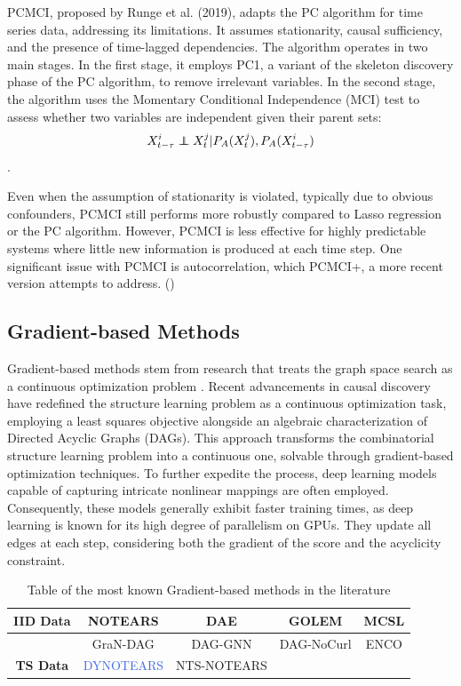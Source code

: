 PCMCI, proposed by Runge et al. (2019), adapts the PC algorithm for time series data, addressing its limitations. It assumes stationarity, causal sufficiency, and the presence of time-lagged dependencies. The algorithm operates in two main stages. In the first stage, it employs PC1, a variant of the skeleton discovery phase of the PC algorithm, to remove irrelevant variables. In the second stage, the algorithm uses the Momentary Conditional Independence (MCI) test to assess whether two variables are independent given their parent sets: $$X^i_{t - \tau} \independent X^j_t | P_A(X^j_t), P_A(X^i_{t - \tau})$$  \cite{hasan2023survey}.

Even when the assumption of stationarity is violated, typically due to obvious confounders, PCMCI still performs more robustly compared to Lasso regression or the PC algorithm. However, PCMCI is less effective for highly predictable systems where little new information is produced at each time step. One significant issue with PCMCI is autocorrelation, which PCMCI+, a more recent version attempts to address. (\cite{runge2020discovering})

\subsection{Gradient-based Methods}
Gradient-based methods stem from research that treats the graph space search as a continuous optimization problem \cite{molak2023causal}. Recent advancements in causal discovery have redefined the structure learning problem as a continuous optimization task, employing a least squares objective alongside an algebraic characterization of Directed Acyclic Graphs (DAGs). This approach transforms the combinatorial structure learning problem into a continuous one, solvable through gradient-based optimization techniques. To further expedite the process, deep learning models capable of capturing intricate nonlinear mappings are often employed. Consequently, these models generally exhibit faster training times, as deep learning is known for its high degree of parallelism on GPUs. They update all edges at each step, considering both the gradient of the score and the acyclicity constraint. \cite{hasan2023survey}\\

\begin{table}[!ht]
    \centering
    \caption{Table of the most known Gradient-based methods in the literature}
    \begin{tabular}{|c|c|c|c|c|}
    \hline
        \textbf{IID Data} & NOTEARS & DAE & GOLEM & MCSL \\ \hline
        \multicolumn{1}{c|}{} & GraN-DAG & DAG-GNN & DAG-NoCurl & ENCO \\ \hline
        \textbf{TS Data} & \textcolor{RoyalBlue}{DYNOTEARS} & NTS-NOTEARS & ~ & ~ \\ \hline
    \end{tabular}
    \label{gbM}
\end{table}

